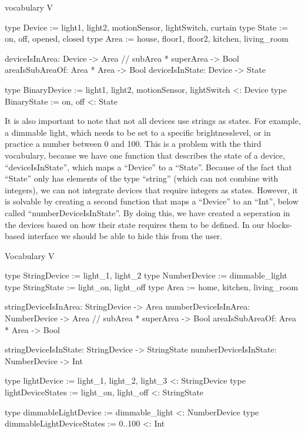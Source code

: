 \documentclass[11pt,a4paper]{report}
\begin{document}
\begin{idplisting}
vocabulary V {
    type Device := {light1, light2, motionSensor,
    lightSwitch, curtain}
    type State := {on, off, opened, closed}
    type Area := {house, floor1, floor2, kitchen, living_room}

    deviceIsInArea: Device -> Area
    // subArea * superArea -> Bool
    areaIsSubAreaOf: Area * Area -> Bool
    deviceIsInState: Device -> State

    type BinaryDevice := {light1, light2,
                          motionSensor, lightSwitch} <: Device
    type BinaryState := {on, off} <: State
}
\end{idplisting}

It is also important to note that not all devices use strings as states. For example, a dimmable light, which needs to be set to a specific brightnesslevel, or in practice a number between 0 and 100. This is a problem with the third vocabulary, because we have one function that describes the state of a device, ``deviceIsInState'', which maps a ``Device'' to a ``State''. Because of the fact that ``State'' only has elements of the type ``string'' (which can not combine with integers), we can not integrate devices that require integers as states. However, it is solvable by creating a second function that maps a ``Device'' to an ``Int'', below called ``numberDeviceIsInState''. By doing this, we have created a seperation in the devices based on how their state requires them to be defined. In our blocks-based interface we should be able to hide this from the user.

\begin{idplisting}
Vocabulary V {
    type StringDevice := {light_1, light_2}
    type NumberDevice := {dimmable_light}
    type StringState := {light_on, light_off}
    type Area := {home, kitchen, living_room}   

    stringDeviceIsInArea: StringDevice -> Area
    numberDeviceIsInArea: NumberDevice -> Area
    // subArea * superArea -> Bool
    areaIsSubAreaOf: Area * Area -> Bool    

    stringDeviceIsInState: StringDevice -> StringState
    numberDeviceIsInState: NumberDevice -> Int  

    type lightDevice := {light_1, light_2, light_3} <: StringDevice
    type lightDeviceStates := {light_on, light_off} <: StringState  

    type dimmableLightDevice := {dimmable_light} <: NumberDevice
    type dimmableLightDeviceStates := {0..100} <: Int
}
\end{idplisting}
\end{document}
